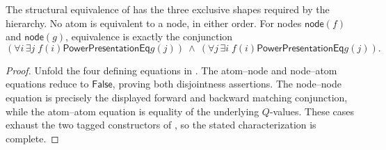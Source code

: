 \begin{lemma}
The structural equivalence of  has the three
exclusive shapes required by the hierarchy.  No atom is equivalent to a
node, in either order.  For nodes
$\mathsf{node}(f)$ and $\mathsf{node}(g)$, equivalence is exactly the
conjunction
\[
 (\forall i\,\exists j\; f(i)\mathrel{\mathsf{PowerPresentationEq}}g(j))
 \ \land\ 
 (\forall j\,\exists i\; f(i)\mathrel{\mathsf{PowerPresentationEq}}g(j)).
\]
\end{lemma}
\begin{proof}
Unfold the four defining equations in
.  The atom--node and node--atom equations
reduce to $\mathsf{False}$, proving both disjointness assertions.  The
node--node equation is precisely the displayed forward and backward
matching conjunction, while the atom--atom equation is equality of the
underlying $Q$-values.  These cases exhaust the two tagged constructors of
\noderef{PowerQ}, so the stated characterization is complete.
\end{proof}
